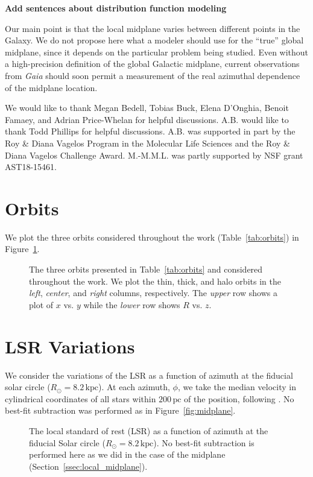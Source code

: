 \documentclass[twocolumn]{aastex62}
\newcommand{\Gus}[1]{\textcolor{red}{#1}}
\newcommand{\pc}{\text{pc}}
\newcommand{\kpc}{\text{kpc}}
\begin{document}
{\bf Add sentences about distribution function modeling}

Our main point is that the local midplane varies between different points in
the Galaxy. We do
not propose here what a modeler should use for the ``true'' global midplane,
since it depends on the particular problem being studied. Even without a
high-precision definition of the global Galactic midplane, current
observations from {\em Gaia} should soon permit a measurement of the real
azimuthal dependence of the midplane location.

\acknowledgments
We would like to thank Megan Bedell, Tobias Buck, Elena D'Onghia, Benoit
Famaey, and Adrian Price-Whelan for helpful discussions. A.B. would like to
thank Todd Phillips for helpful discussions. A.B. was supported in part by the
Roy \& Diana Vagelos Program in the Molecular Life Sciences and the Roy \&
Diana Vagelos Challenge Award.
M.-M.M.L. was partly supported by NSF grant AST18-15461.

\appendix
\section{Orbits} \label{app:orbits}
We plot the three orbits considered throughout the work
(Table~\ref{tab:orbits}) in Figure~\ref{fig:plot_orbits}.

\begin{figure}
\caption{The three orbits presented in Table~\ref{tab:orbits} and considered
throughout the work. We plot the thin, thick, and halo orbits in the {\em
left}, {\em center}, and {\em right} columns, respectively. The {\em upper}
row shows a plot of $x$ vs. $y$ while the {\em lower} row shows $R$ vs. $z$.}
\label{fig:plot_orbits}
\end{figure}

\section{LSR Variations} \label{app:lsr}
We consider the variations of the LSR as a function of azimuth at the fiducial
solar circle ($R_{\odot} = 8.2\,\kpc$). At each azimuth, $\phi$, we take the
median velocity in cylindrical coordinates of all stars within $200\,\pc$ of
the position, following \citet{2018arXiv180610564S}. No best-fit subtraction
was performed as in Figure~\ref{fig:midplane}.

\begin{figure}
\caption{The local standard of rest (LSR) as a function of azimuth at the
fiducial Solar circle ($R_{\odot} = 8.2\,\kpc$). No best-fit subtraction is
performed here as we did in the case of the midplane
(Section~\ref{ssec:local_midplane}).}
\end{figure}


\end{document}
